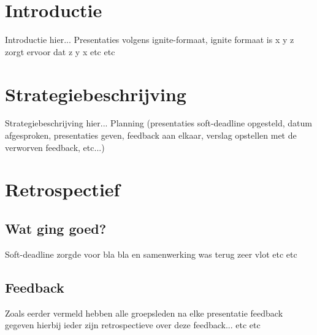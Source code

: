 \documentclass[fleqn,10pt]{voorstel}
\begin{document}
\flushbottom %

\maketitle %

\tableofcontents %

\thispagestyle{empty} %


\section{Introductie} %
Introductie hier...
Presentaties volgens ignite-formaat, ignite formaat is x y z zorgt ervoor dat z y x etc etc

\section{Strategiebeschrijving}
Strategiebeschrijving hier...
Planning (presentaties soft-deadline opgesteld, datum afgesproken, presentaties geven, feedback aan elkaar, verslag opstellen met de verworven feedback, etc...)

\section{Retrospectief}
\subsection{Wat ging goed?}
Soft-deadline zorgde voor bla bla en samenwerking was terug zeer vlot etc etc

\subsection{Feedback}
Zoals eerder vermeld hebben alle groepsleden na elke presentatie feedback gegeven hierbij ieder zijn retrospectieve over deze feedback... etc etc
\end{document}

